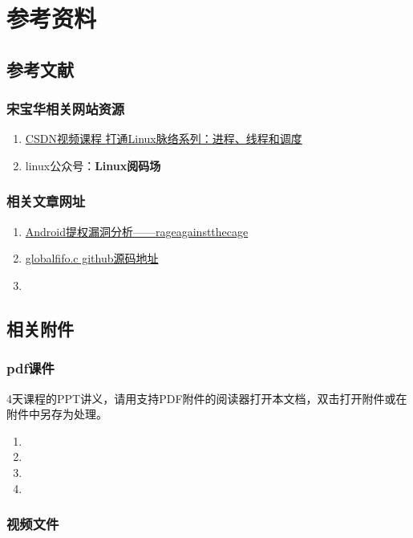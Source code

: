 

\partabstractfp{}
\part{参考资料}
\chapter{参考文献}
\section{宋宝华相关网站资源}
\begin{enumerate}
  \item \href{https://edu.csdn.net/course/detail/5995}{CSDN视频课程 打通Linux脉络系列：进程、线程和调度}
  \item linux公众号：\textbf{Linux阅码场}
\end{enumerate}

\section{相关文章网址}
\begin{enumerate}
  \item \href{https://blog.csdn.net/feglass/article/details/46403501}{Android提权漏洞分析——rageagainstthecage}
  \item \href{https://github.com/21cnbao/training/blob/master/kernel/drivers/globalfifo/ch12/globalfifo.c}{globalfifo.c github源码地址}
  \item 
\end{enumerate}

\chapter{相关附件}
\section{pdf课件}
4天课程的PPT讲义，请用支持PDF附件的阅读器打开本文档，双击打开附件或在附件中另存为处理。
\begin{enumerate}
  \item {}
  \item {}
  \item {}
  \item {}
\end{enumerate}



\section{视频文件}
\ifattachpdffile

\else
\videowarn
\fi
